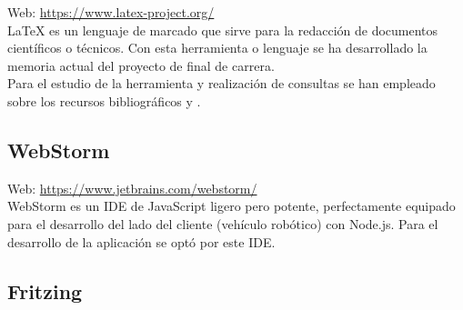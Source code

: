 Web: \url{https://www.latex-project.org/}\\

\LaTeX \: es un lenguaje de marcado que sirve para la redacción de documentos científicos o técnicos. Con esta herramienta o lenguaje se ha desarrollado la memoria actual del proyecto de final de carrera.\\

Para el estudio de la herramienta y realización de consultas se han empleado sobre los recursos bibliográficos \cite{book:LaTeX} y \cite{website:6}.\\


\subsection{WebStorm}


Web: \url{https://www.jetbrains.com/webstorm/}\\

WebStorm es un IDE de JavaScript ligero pero potente, perfectamente equipado para el desarrollo del lado del cliente (vehículo robótico) con Node.js. Para el desarrollo de la aplicación se optó por este IDE. \\

\subsection{Fritzing}

